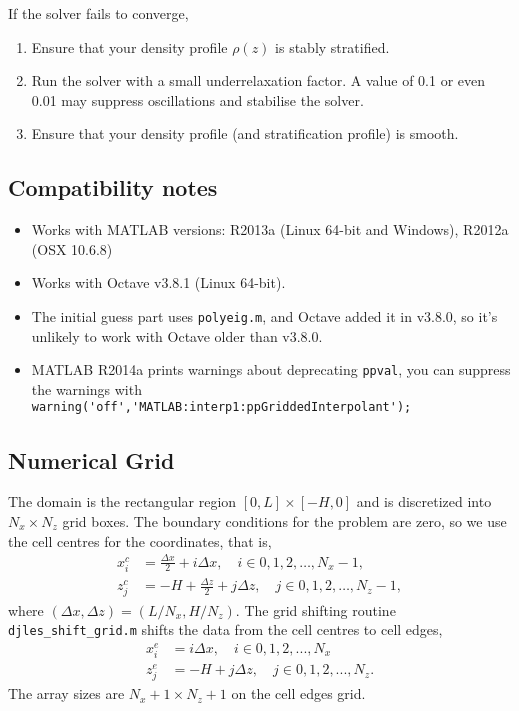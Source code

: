 \documentclass[letterpaper]{article}
\begin{document}
If the solver fails to converge, 
\begin{enumerate}
 \item Ensure that your density profile $\rho(z)$ is stably stratified.
 \item Run the solver with a small underrelaxation factor. A value of 0.1 or even 0.01 may suppress oscillations and stabilise the solver. 
 \item Ensure that your density profile (and stratification profile) is smooth.
\end{enumerate}

\subsection{Compatibility notes}
\begin{itemize}
 \item Works with MATLAB versions: R2013a (Linux 64-bit and Windows), R2012a (OSX 10.6.8)
 \item Works with Octave v3.8.1 (Linux 64-bit).
 \item The initial guess part uses \verb+polyeig.m+, and Octave added it in v3.8.0, so it's unlikely to work with Octave older than v3.8.0.
 \item MATLAB R2014a prints warnings about deprecating \verb+ppval+, you can suppress the warnings with \\ \verb+warning('off','MATLAB:interp1:ppGriddedInterpolant');+
\end{itemize}

\subsection{Numerical Grid}
The domain is the rectangular region $[0,L] \times [-H,0]$ and is discretized into $N_x\times N_z$ grid boxes. The boundary conditions for the problem are zero, so we use the cell centres for the coordinates, that is,
\begin{align}
x_i^c &= \frac{\Delta x}{2}  + i \Delta x, \quad i \in 0,1,2,\hdots,N_x-1,\\
z_j^c &= -H + \frac{\Delta z}{2}  + j \Delta z, \quad j  \in 0,1,2,\hdots,N_z-1,
\end{align}
where $(\Delta x, \Delta z) = (L/N_x, H/N_z)$. The grid shifting routine \verb+djles_shift_grid.m+ shifts the data from the cell centres to cell edges, 
\begin{align}
x_i^e &= i \Delta x, \quad i \in 0,1,2,...,N_x\\
z_j^e &= -H + j \Delta z, \quad j  \in 0,1,2,...,N_z.
\end{align}
The array sizes are $N_x+1 \times N_z+1$ on the cell edges grid.
\end{document}
